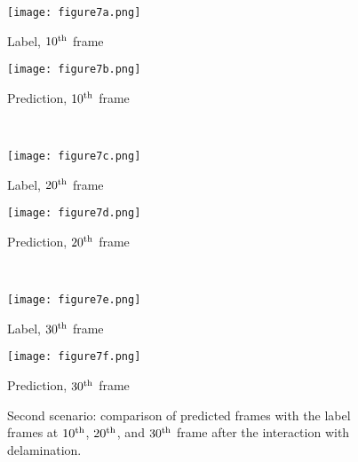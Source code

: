 \documentclass[pdflatex,sn-mathphys-num]{sn-jnl}%
\begin{document}
\begin{figure}
	\centering
	\begin{minipage}[b]{0.44\textwidth}
		\centering
		\texttt{[image: figure7a.png]}
		\caption*{Label, $10\textsuperscript{th}$ frame}
		\label{fig:num_453_label1}
	\end{minipage}
	\hfill
	\begin{minipage}[b]{0.44\textwidth}
		\centering
		\texttt{[image: figure7b.png]}
		\caption*{Prediction, $10\textsuperscript{th}$ frame}
		\label{fig:num_453_pred1}
	\end{minipage}
	\\
	\begin{minipage}[b]{0.44\textwidth}
		\centering
		\texttt{[image: figure7c.png]}
		\caption*{Label, $20\textsuperscript{th}$ frame}
		\label{fig:num_453_label2}
	\end{minipage}
	\hfill
	\begin{minipage}[b]{0.44\textwidth}
		\centering
		\texttt{[image: figure7d.png]}
		\caption*{Prediction, $20\textsuperscript{th}$ frame}
		\label{fig:num_453_pred2}
	\end{minipage}
	\\
	\begin{minipage}[b]{0.44\textwidth}
		\centering
		\texttt{[image: figure7e.png]}
		\caption*{Label, $30\textsuperscript{th}$ frame}
		\label{fig:num_453_label3}
	\end{minipage}
	\hfill
	\begin{minipage}[b]{0.44\textwidth}
		\centering
		\texttt{[image: figure7f.png]}
		\caption*{Prediction, $30\textsuperscript{th}$ frame}
		\label{fig:num_453_pred3}
	\end{minipage}
	\caption{Second scenario: comparison of predicted frames with the label 
	frames at $10\textsuperscript{th}$, $20\textsuperscript{th}$, and 
	$30\textsuperscript{th}$ frame after the interaction with 
	delamination.}
\label{fig:num_453}
\end{figure}
\end{document}
